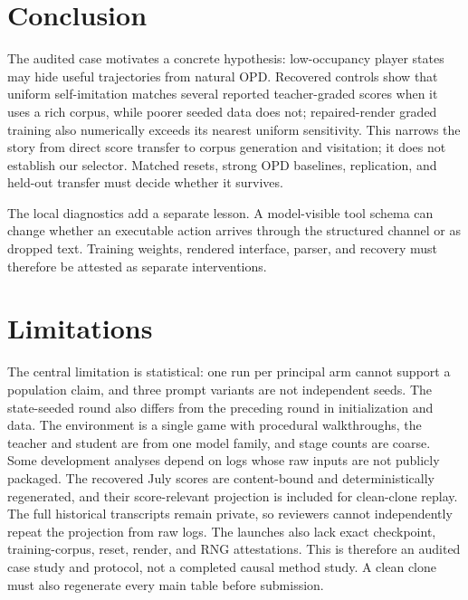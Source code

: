 \documentclass[11pt,a4paper]{article}
\begin{document}
\section{Conclusion}

The audited case motivates a concrete hypothesis: low-occupancy player states
may hide useful trajectories from natural OPD. Recovered controls show that
uniform self-imitation matches several reported teacher-graded scores when it
uses a rich corpus, while poorer seeded data does not; repaired-render graded
training also numerically exceeds its nearest uniform sensitivity. This narrows
the story from direct score transfer to corpus generation and visitation; it
does not establish our selector. Matched resets, strong
OPD baselines, replication, and held-out transfer must decide whether it
survives.

The local diagnostics add a separate lesson. A model-visible tool schema can
change whether an executable action arrives through the structured channel or
as dropped text. Training weights, rendered interface, parser, and recovery
must therefore be attested as separate interventions.

\label{acl:main-content-end}
\section*{Limitations}

The central limitation is statistical: one run per principal arm cannot support
a population claim, and three prompt variants are not independent seeds. The
state-seeded round also differs from the preceding round in initialization and
data. The environment is a single game with procedural walkthroughs, the
teacher and student are from one model family, and stage counts are coarse. Some
development analyses depend on logs whose raw inputs are not publicly packaged.
The recovered July scores are content-bound and deterministically regenerated,
and their score-relevant projection is included for clean-clone replay. The
full historical transcripts remain private, so reviewers cannot independently
repeat the projection from raw logs. The launches also lack exact checkpoint,
training-corpus, reset, render, and RNG
attestations. This is therefore an audited case study and protocol, not a
completed causal method study. A clean clone must also regenerate every main
table before submission.
\end{document}
